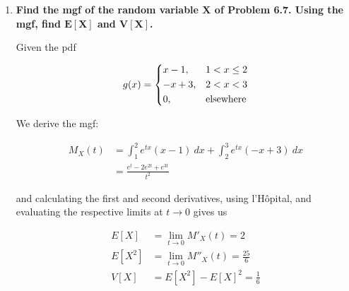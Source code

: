\documentclass[10pt, oneside]{article}
\begin{document}
\begin{enumerate}[label=10.\arabic*]
\begin{enumerate}
	\[ M_X(t) = \sum^6_{k=1} e^{tk} p(k) = \boxed{ \frac{1}{6} \sum^6_{k=1} e^{tk} } \]
	
	\item  \begin{tcolorbox}[
	  colback=Cerulean!5!white,
	  colframe=Cerulean!75!black]
	\textbf{Using the mgf, find $\bm{E[X]}$ and $\bm{V[X]}$.}
	\end{tcolorbox}
	
	We derive
	
	\begin{align*}
	M'_X(t) &= \frac{1}{6}  \sum^6_{k=1} k e^{tk} \\
	E[X] = M'_X(0) &= \boxed{\frac{7}{2}} \\
	M''_X(t) &= \frac{1}{6}  \sum^6_{k=1} k^2 e^{tk} \\
	E[X^2] = M''_X(0) &= \boxed{\frac{91}{6}} \\
	V[X] = E[X^2] - E[X]^2 &= \boxed{ \frac{35}{12} }
	\end{align*}
	
	\end{enumerate}

\item  \begin{tcolorbox}[
  colback=Cerulean!5!white,
  colframe=Cerulean!75!black]
\textbf{Find the mgf of the random variable $\bm{X}$ of Problem 6.7. Using the mgf, find $\bm{E[X]}$ and $\bm{V[X]}$.}
\end{tcolorbox}

Given the pdf

\[
g(x) = \begin{dcases}
x-1, & 1 < x \leq 2 \\
-x + 3, & 2 < x < 3 \\
0, & \text{elsewhere}
\end{dcases}
\]

We derive the mgf:

\begin{align*}
M_X(t) &= \int^2_1 e^{tx} (x-1) \ dx + \int^3_2 e^{tx} (-x+3) \ dx \\
&= \frac{e^t - 2e^{2t} + e^{3t}}{t^2}
\end{align*}

and calculating the first and second derivatives, using l'H\^{o}pital, and evaluating the respective limits at $t \rightarrow 0$ gives us

\begin{align*}
E[X] &= \lim_{t \rightarrow 0} M'_X(t) = \boxed{2} \\
E[X^2] &= \lim_{t \rightarrow 0} M''_X(t) = \frac{25}{6} \\
V[X] &= E[X^2] - E[X]^2 = \boxed{\frac{1}{6}}
\end{align*}


\end{enumerate}
\end{document}
